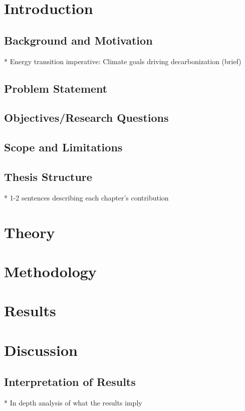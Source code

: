 \section{Introduction}


\subsection{Background and Motivation}
* Energy transition imperative: Climate goals driving decarbonization (brief)

\subsection{Problem Statement}

\subsection{Objectives/Research Questions}

\subsection{Scope and Limitations}

\subsection{Thesis Structure}
* 1-2 sentences describing each chapter's contribution




\section{Theory}




\section{Methodology}




\section{Results}




\section{Discussion}

\subsection{Interpretation of Results}
* In depth analysis of what the results imply

